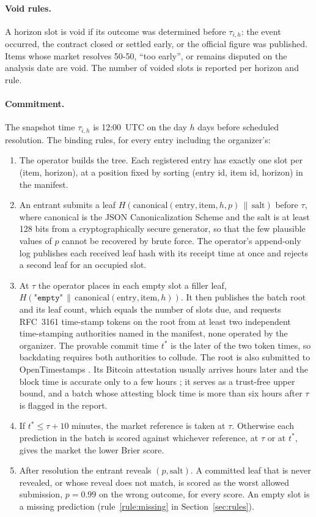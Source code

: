 \documentclass[11pt]{article}
\begin{document}
\paragraph{Void rules.} A horizon slot is void if its outcome was determined before $\tau_{i,h}$: the event occurred, the contract closed or settled early, or the official figure was published. Items whose market resolves 50-50, ``too early'', or remains disputed on the analysis date are void. The number of voided slots is reported per horizon and rule.

\paragraph{Commitment.} The snapshot time $\tau_{i,h}$ is 12:00~UTC on the day $h$ days before scheduled resolution. The binding rules, for every entry including the organizer's:
\begin{enumerate}
  \item The operator builds the tree. Each registered entry has exactly one slot per (item, horizon), at a position fixed by sorting (entry id, item id, horizon) in the manifest.
  \item An entrant submits a leaf $H(\text{canonical}(\text{entry}, \text{item}, h, p) \,\|\, \text{salt})$ before $\tau$, where canonical is the JSON Canonicalization Scheme \citep{rfc8785} and the salt is at least 128 bits from a cryptographically secure generator, so that the few plausible values of $p$ cannot be recovered by brute force. The operator's append-only log publishes each received leaf hash with its receipt time at once and rejects a second leaf for an occupied slot.
  \item At $\tau$ the operator places in each empty slot a filler leaf, $H(\texttt{"empty"} \,\|\, \text{canonical}(\text{entry}, \text{item}, h))$. It then publishes the batch root and its leaf count, which equals the number of slots due, and requests RFC~3161 time-stamp tokens \citep{rfc3161} on the root from at least two independent time-stamping authorities named in the manifest, none operated by the organizer. The provable commit time $t^\ast$ is the later of the two token times, so backdating requires both authorities to collude. The root is also submitted to OpenTimestamps \citep{opentimestamps}. Its Bitcoin attestation usually arrives hours later and the block time is accurate only to a few hours \citep{todd2016ots}; it serves as a trust-free upper bound, and a batch whose attesting block time is more than six hours after $\tau$ is flagged in the report.
  \item If $t^\ast \le \tau + 10$ minutes, the market reference is taken at $\tau$. Otherwise each prediction in the batch is scored against whichever reference, at $\tau$ or at $t^\ast$, gives the market the lower Brier score.
  \item After resolution the entrant reveals $(p, \text{salt})$. A committed leaf that is never revealed, or whose reveal does not match, is scored as the worst allowed submission, $p = 0.99$ on the wrong outcome, for every score. An empty slot is a missing prediction (rule~\ref{rule:missing} in Section~\ref{sec:rules}).
\end{enumerate}
\end{document}
